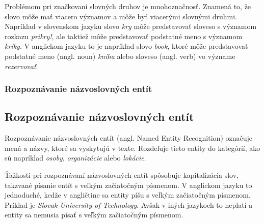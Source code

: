 Problémom pri značkovaní slovných druhov je mnohoznačnosť. Znamená to, že slovo môže mať viacero významov a môže byť viacerými slovnými druhmi. Napríklad v slovenskom jazyku slovo \textit{kry} môže predstavovať sloveso s významom rozkazu \textit{prikry!}, ale taktiež môže predstavovať podstatné meno s významom \textit{kríky}. V anglickom jazyku to je napríklad slovo \textit{book}, ktoré môže predstavovať podstatné meno (angl. noun) \textit{kniha} alebo sloveso (angl. verb) vo význame \textit{rezervovať}.

{
	\subsubsection{Rozpoznávanie názvoslovných entít}
}
{
	\subsection{Rozpoznávanie názvoslovných entít}
}
\label{subsubsec:ner}
Rozpoznávanie názvoslovných entít (angl. Named Entity Recognition) označuje mená a názvy, ktoré sa vyskytujú v texte. Rozdeľuje tieto entity do kategórií, ako sú napríklad \textit{osoby}, \textit{organizácie} alebo \textit{lokácie}.

Ťažkosti pri rozpoznávaní názvoslovných entít spôsobuje kapitalizácia slov, takzvané písanie entít s veľkým začiatočným písmenom. V anglickom jazyku to jednoduché, kedže v angličtine sa entity píšu s veľkým začiatočným písmenom. Príklad je \textit{Slovak University of Technology}. Avšak v iných jazykoch to neplatí a entity sa nemusia písať s veľkým začiatočným písmenom.

